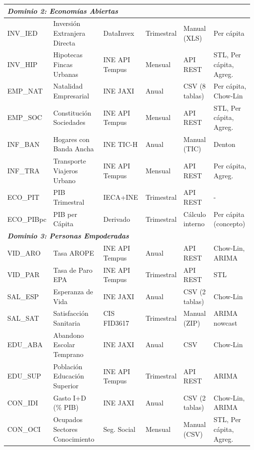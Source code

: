 \documentclass[authoryear,12pt]{elsarticle}
\begin{document}
\begin{longtable}{p{1.8cm}p{3.5cm}p{2.2cm}p{1.5cm}p{2.5cm}p{2cm}}
\midrule
\multicolumn{6}{l}{\textit{\textbf{Dominio 2: Economías Abiertas}}} \\
\midrule

INV\_IED & Inversión Extranjera Directa & DataInvex & Trimestral & Manual (XLS) & Per cápita \\

INV\_HIP & Hipotecas Fincas Urbanas & INE API Tempus & Mensual & API REST & STL, Per cápita, Agreg. \\

EMP\_NAT & Natalidad Empresarial & INE JAXI & Anual & CSV (8 tablas) & Per cápita, Chow-Lin \\

EMP\_SOC & Constitución Sociedades & INE API Tempus & Mensual & API REST & STL, Per cápita, Agreg. \\

INF\_BAN & Hogares con Banda Ancha & INE TIC-H & Anual & Manual (TIC) & Denton \\

INF\_TRA & Transporte Viajeros Urbano & INE API Tempus & Mensual & API REST & Per cápita, Agreg. \\

ECO\_PIT & PIB Trimestral & IECA+INE & Trimestral & API REST & - \\

ECO\_PIBpc & PIB per Cápita & Derivado & Trimestral & Cálculo interno & Per cápita (concepto) \\

\midrule
\multicolumn{6}{l}{\textit{\textbf{Dominio 3: Personas Empoderadas}}} \\
\midrule

VID\_ARO & Tasa AROPE & INE API Tempus & Anual & API REST & Chow-Lin, ARIMA \\

VID\_PAR & Tasa de Paro EPA & INE API Tempus & Trimestral & API REST & STL \\

SAL\_ESP & Esperanza de Vida & INE JAXI & Anual & CSV (2 tablas) & Chow-Lin \\

SAL\_SAT & Satisfacción Sanitaria & CIS FID3617 & Trimestral & Manual (ZIP) & ARIMA nowcast \\

EDU\_ABA & Abandono Escolar Temprano & INE JAXI & Anual & CSV & Chow-Lin \\

EDU\_SUP & Población Educación Superior & INE API Tempus & Trimestral & API REST & ARIMA \\

CON\_IDI & Gasto I+D (\% PIB) & INE JAXI & Anual & CSV (2 tablas) & Chow-Lin, ARIMA \\

CON\_OCI & Ocupados Sectores Conocimiento & Seg. Social & Mensual & Manual (CSV) & STL, Per cápita, Agreg. \\

\end{longtable}
\end{document}
